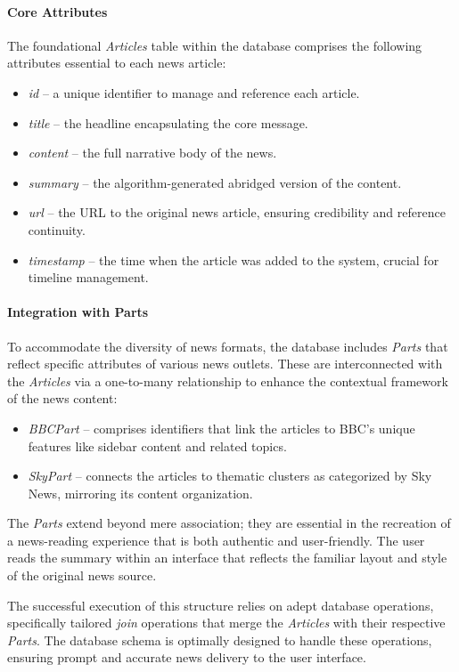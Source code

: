 \documentclass[10pt]{article}
\begin{document}
\paragraph{Core Attributes}
The foundational \textit{Articles} table within the database comprises the following attributes essential to each news article:
\begin{itemize}
    \item \textit{id} -- a unique identifier to manage and reference each article.
    \item \textit{title} -- the headline encapsulating the core message.
    \item \textit{content} -- the full narrative body of the news.
    \item \textit{summary} -- the algorithm-generated abridged version of the content.
    \item \textit{url} -- the URL to the original news article, ensuring credibility and reference continuity.
    \item \textit{timestamp} -- the time when the article was added to the system, crucial for timeline management.
\end{itemize}

\paragraph{Integration with Parts}
To accommodate the diversity of news formats, the database includes \textit{Parts} that reflect specific attributes of various news outlets. These are interconnected with the \textit{Articles} via a one-to-many relationship to enhance the contextual framework of the news content:
\begin{itemize}
    \item \textit{BBCPart} -- comprises identifiers that link the articles to BBC's unique features like sidebar content and related topics.
    \item \textit{SkyPart} -- connects the articles to thematic clusters as categorized by Sky News, mirroring its content organization.
\end{itemize}

The \textit{Parts} extend beyond mere association; they are essential in the recreation of a news-reading experience that is both authentic and user-friendly. The user reads the summary within an interface that reflects the familiar layout and style of the original news source.

The successful execution of this structure relies on adept database operations, specifically tailored \textit{join} operations that merge the \textit{Articles} with their respective \textit{Parts}. The database schema is optimally designed to handle these operations, ensuring prompt and accurate news delivery to the user interface.
\end{document}
